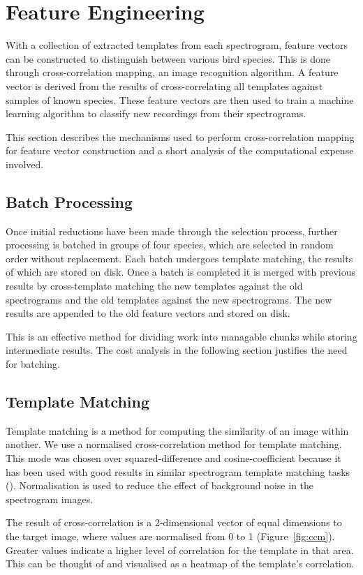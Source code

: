 \section{Feature Engineering}\label{sec:ccm}
With a collection of extracted templates from each spectrogram, feature vectors
can be constructed to distinguish between various bird species.
This is done through cross-correlation mapping, an image recognition algorithm.
A feature vector is derived from the results of cross-correlating all
templates against samples of known species.
These feature vectors are then used to train a machine learning algorithm to
classify new recordings from their spectrograms.

This section describes the mechanisms used to perform cross-correlation mapping
for feature vector construction and a short analysis of the computational
expense involved.

\subsection{Batch Processing}
Once initial reductions have been made through the selection process,
further processing is batched in groups of four species, which are selected in
random order without replacement.
Each batch undergoes template matching, the results of which are stored on disk.
Once a batch is completed it is merged with previous results by cross-template
matching the new templates against the old spectrograms and the old templates
against the new spectrograms.
The new results are appended to the old feature vectors and stored on disk.

This is an effective method for dividing work into managable chunks while storing
intermediate results.
The cost analysis in the following section justifies the need for batching.

\subsection{Template Matching}
Template matching is a method for computing the similarity of an image within
another.
We use a normalised cross-correlation method for template matching.
This mode was chosen over squared-difference and cosine-coefficient because it
has been used with good results in similar spectrogram template matching tasks
(\textcite{lasseck2013}).
Normalisation is used to reduce the effect of background noise in the
spectrogram images.

The result of cross-correlation is a 2-dimensional vector of equal dimensions to
the target image, where values are normalised from 0 to 1 (Figure~\ref{fig:ccm}).
Greater values indicate a higher level of correlation for the template in that
area.
This can be thought of and visualised as a heatmap of the template's correlation.

